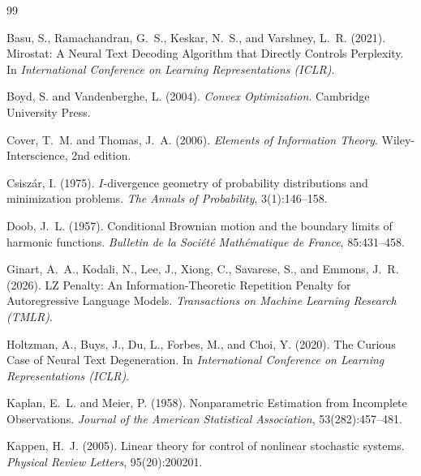 \documentclass[11pt]{article}
\begin{document}
\begin{thebibliography}{99}
\providecommand{\natexlab}[1]{#1}

Basu, S., Ramachandran, G.~S., Keskar, N.~S., and Varshney, L.~R. (2021).
\newblock Mirostat: A Neural Text Decoding Algorithm that Directly Controls Perplexity.
\newblock In \emph{International Conference on Learning Representations (ICLR)}.

Boyd, S. and Vandenberghe, L. (2004).
\newblock \emph{Convex Optimization}.
\newblock Cambridge University Press.

Cover, T.~M. and Thomas, J.~A. (2006).
\newblock \emph{Elements of Information Theory}.
\newblock Wiley-Interscience, 2nd edition.

Csisz{\'a}r, I. (1975).
\newblock $I$-divergence geometry of probability distributions and minimization problems.
\newblock \emph{The Annals of Probability}, 3(1):146--158.

Doob, J.~L. (1957).
\newblock Conditional Brownian motion and the boundary limits of harmonic functions.
\newblock \emph{Bulletin de la Soci{\'e}t{\'e} Math{\'e}matique de France}, 85:431--458.

Ginart, A.~A., Kodali, N., Lee, J., Xiong, C., Savarese, S., and Emmons, J.~R. (2026).
\newblock LZ Penalty: An Information-Theoretic Repetition Penalty for Autoregressive Language Models.
\newblock \emph{Transactions on Machine Learning Research (TMLR)}.

Holtzman, A., Buys, J., Du, L., Forbes, M., and Choi, Y. (2020).
\newblock The Curious Case of Neural Text Degeneration.
\newblock In \emph{International Conference on Learning Representations (ICLR)}.

Kaplan, E.~L. and Meier, P. (1958).
\newblock Nonparametric Estimation from Incomplete Observations.
\newblock \emph{Journal of the American Statistical Association}, 53(282):457--481.

Kappen, H.~J. (2005).
\newblock Linear theory for control of nonlinear stochastic systems.
\newblock \emph{Physical Review Letters}, 95(20):200201.


\end{thebibliography}
\end{document}
